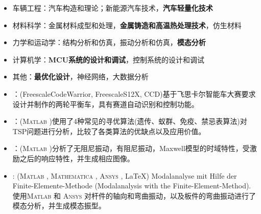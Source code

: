 \documentclass[zh]{resume}
\newcommand{\Matlab}{\textsc{Matlab}\textsuperscript{\textregistered} }
\newcommand{\Ansys}{\textsc{Ansys}\textsuperscript{\textregistered} }
\newcommand{\Mathematica}{\textsc{Mathematica}\textsuperscript{\textregistered} }
\newcommand{\Microsoft}{\textsc{Microsoft}\textsuperscript{\textregistered} }
\begin{document}
\begin{itemize}
  \item 车辆工程：汽车构造和理论；新能源汽车技术，\textbf{汽车轻量化技术}
  \item 材料科学：金属材料成型和处理，\textbf{金属铸造和高温热处理技术}，仿生材料
  \item 力学和运动学：结构分析和仿真，振动分析和仿真，\textbf{模态分析}
  \item 计算机学：\textbf{MCU系统的设计和调试}，控制系统的设计和调试
  \item 其他：\textbf{最优化设计}，神经网络，大数据分析
\end{itemize}

% 
%  
%  
%  

\begin{itemize}
	\item {}：(Freescale\textregistered CodeWarrior, Freescale\textregistered S12X, CCD)基于飞思卡尔智能车大赛要求设计并制作的两轮平衡车，具有赛道自动识别和控制功能。
	
	\item {}：(\Matlab)使用了4种常见的寻优算法(遗传、蚁群、免疫、禁忌表算法)对TSP问题进行分析，比较了各类算法的优缺点以及应用价值。
	
	\item {}：(\Matlab)分析了无阻尼振动，有阻尼振动，Maxwell模型的时域特性，受激励之后的响应特性，并生成相应图像。
	
	\item {}: (\Matlab, \Mathematica, \Ansys, \LaTeX)
	      Modalanalyse mit Hilfe der Finite-Elemente-Methode (Modalanalysis with the Finite-Element-Method). 使用\Matlab 和 \Ansys 对杆件的轴向和弯曲振动，以及板件的弯曲振动进行了模态分析，并生成模态振型。
  		
\end{itemize}
\end{document}
